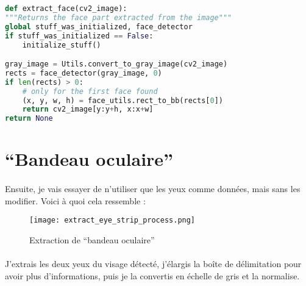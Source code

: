 \begin{lstlisting}[language=Python, caption = Extraction du visage en Python3]
def extract_face(cv2_image):
"""Returns the face part extracted from the image"""
global stuff_was_initialized, face_detector
if stuff_was_initialized == False:
    initialize_stuff()

gray_image = Utils.convert_to_gray_image(cv2_image)
rects = face_detector(gray_image, 0)
if len(rects) > 0:
    # only for the first face found
    (x, y, w, h) = face_utils.rect_to_bb(rects[0])
    return cv2_image[y:y+h, x:x+w]
return None
\end{lstlisting}

\section{``Bandeau oculaire''}
\paragraph{}
Ensuite, je vais essayer de n'utiliser que les yeux comme données, mais sans les modifier.
Voici à quoi cela ressemble :

\begin{figure}[H]
    \centering
    \texttt{[image: extract\_eye\_strip\_process.png]}
    \caption{Extraction de ``bandeau oculaire''}
    \label{fig_extracting_eye_strip}
\end{figure}

\paragraph{}
J'extrais les deux yeux du visage détecté, j'élargis la boîte de délimitation pour avoir plus d'informations, puis je la convertis en échelle de gris et la normalise.

